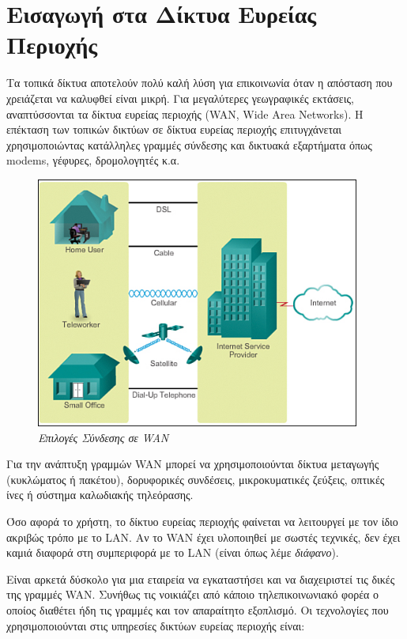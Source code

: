 %
%
\section*{Εισαγωγή στα Δίκτυα Ευρείας Περιοχής}

Τα τοπικά δίκτυα αποτελούν πολύ καλή λύση για επικοινωνία όταν η απόσταση που χρειάζεται να καλυφθεί είναι μικρή. Για μεγαλύτερες γεωγραφικές εκτάσεις, αναπτύσσονται τα δίκτυα ευρείας περιοχής (WAN, Wide Area Networks). Η επέκταση των τοπικών δικτύων σε δίκτυα ευρείας περιοχής επιτυγχάνεται χρησιμοποιώντας κατάλληλες γραμμές σύνδεσης και δικτυακά εξαρτήματα όπως modems, γέφυρες, δρομολογητές κ.α.

\begin{figure}[!ht]
  \centering
  \includegraphics[width=0.95\textwidth]{images/chapter5/5-1}
  \caption {\textsl{Επιλογές Σύνδεσης σε WAN}}
  \label{5-1}
\end{figure} 

Για την ανάπτυξη γραμμών WAN μπορεί να χρησιμοποιούνται δίκτυα μεταγωγής (κυκλώματος ή πακέτου), δορυφορικές συνδέσεις, μικροκυματικές ζεύξεις, οπτικές ίνες ή σύστημα καλωδιακής τηλεόρασης.

Όσο αφορά το χρήστη, το δίκτυο ευρείας περιοχής φαίνεται να λειτουργεί με τον ίδιο ακριβώς τρόπο με το LAN. Αν το WAN έχει υλοποιηθεί με σωστές τεχνικές, δεν έχει καμιά διαφορά στη συμπεριφορά με το LAN (είναι όπως λέμε \emph{διάφανο}).

Είναι αρκετά δύσκολο για μια εταιρεία να εγκαταστήσει και να διαχειριστεί τις δικές της γραμμές WAN. Συνήθως τις νοικιάζει από κάποιο τηλεπικοινωνιακό φορέα ο οποίος διαθέτει ήδη τις γραμμές και τον απαραίτητο εξοπλισμό. Οι τεχνολογίες που χρησιμοποιούνται στις υπηρεσίες δικτύων ευρείας περιοχής είναι:


